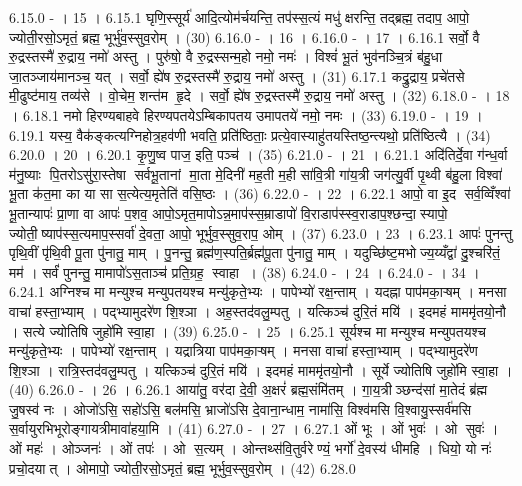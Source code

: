 6.15.0
- । 15 ।
6.15.1
घृणि॒स्सूर्य॑ आदि॒त्योम॑र्चयन्ति॒ तप॑स्स॒त्यं मधु॑ क्षरन्ति॒ तद्ब्रह्म॒ तदाप॒ आपो॒ ज्योती॒रसो॒ऽमृतं॒ ब्रह्म॒ भूर्भु॑व॒स्सुव॒रोम् । (30)
6.16.0
- । 16 ।
6.16.0
- । 17 ।
6.16.1
सर्वो॒ वै रु॒द्रस्तस्मै॑ रु॒द्राय॒ नमो॑ अस्तु । पुरु॑षो॒ वै रु॒द्रस्सन्म॒हो नमो॒ नमः॑ । विश्वं॑ भू॒तं भुव॑नञ्चि॒त्रं ब॑हु॒धा जा॒तञ्जाय॑मानञ्च॒ यत् । सर्वो॒ ह्ये॑ष रु॒द्रस्तस्मै॑ रु॒द्राय॒ नमो॑ अस्तु । (31)
6.17.1
कद्रु॒द्राय॒ प्रचे॑तसे मी॒ढुष्ट॑माय॒ तव्य॑से । वो॒चेम॒ शन्त॑म हृ॒दे । सर्वो॒ ह्ये॑ष रु॒द्रस्तस्मै॑ रु॒द्राय॒ नमो॑ अस्तु । (32)
6.18.0
- । 18 ।
6.18.1
नमो हिरण्यबाहवे हिरण्यपतयेऽम्बिकापतय उमापतये॑ नमो॒ नमः । (33)
6.19.0
- । 19 ।
6.19.1
यस्य॒ वैक॑ङ्कत्यग्निहोत्र॒हव॑णी भवति॒ प्रति॑ष्ठिताः॒ प्रत्ये॒वास्याहु॑तयस्तिष्ठ॒न्त्यथो॒ प्रति॑ष्ठित्यै । (34)
6.20.0
। 20 ।
6.20.1
कृ॒णु॒ष्व पाज॒ इति॒ पञ्च॑ । (35)
6.21.0
- । 21 ।
6.21.1
अदि॑तिर्दे॒वा ग॑न्ध॒र्वा म॑नु॒ष्याः पि॒तरोऽसु॑रा॒स्तेषा॑ सर्वभू॒तानां मा॒ता मे॒दिनी॑ मह॒ती म॒ही सा॑वि॒त्री गा॑य॒त्री जग॑त्यु॒र्वी पृ॒थ्वी ब॑हु॒ला विश्वा॑ भू॒ता क॑त॒मा का या सा स॒त्येत्य॒मृतेति॑ वसि॒ष्ठः । (36)
6.22.0
- । 22 ।
6.22.1
आपो॒ वा इ॒द सर्व॒व्विँश्वा॑ भू॒तान्यापः॑ प्रा॒णा वा आपः॑ प॒शव॒ आपो॒ऽमृत॒मापोऽन्न॒माप॑स्स॒म्राडापो॑ वि॒राडाप॑स्स्व॒राडाप॒श्छन्दा॒॒स्यापो॒ ज्योती॒॒ष्याप॑स्स॒त्यमाप॒स्सर्वा॑ दे॒वता॒ आपो॒ भूर्भुव॒स्सुव॒राप॒ ओम् । (37)
6.23.0
। 23 ।
6.23.1
आपः॑ पुनन्तु पृथि॒वीं पृ॑थि॒वी पू॒ता पु॑नातु॒ माम् । पु॒नन्तु॒ ब्रह्म॑ण॒स्पति॒र्ब्रह्म॑पू॒ता पु॑नातु॒ माम् । यदुच्छि॑ष्ट॒मभोज्य॒य्यँद्वा॑ दु॒श्चरि॑तं॒ मम॑ । सर्वं॑ पुनन्तु॒ मामापो॑ऽस॒ताञ्च॑ प्रति॒ग्रह॒॒ स्वाहा । (38)
6.24.0
- । 24 ।
6.24.0
- । 34 ।
6.24.1
अग्निश्च मा मन्युश्च मन्युपतयश्च मन्यु॑कृते॒भ्यः । पापेभ्यो॑ रक्ष॒न्ताम् । यदह्ना पाप॑मका॒ऱ्षम् । मनसा वाचा॑ हस्ता॒भ्याम् । पद्भ्यामुदरे॑ण शि॒श्ञा । अह॒स्तद॑वलु॒म्पतु । यत्किञ्च॑ दुरि॒तं मयि॑ । इदमहं माममृ॑तयो॒नौ । सत्ये ज्योतिषि जुहो॑मि स्वा॒हा । (39)
6.25.0
- । 25 ।
6.25.1
सूर्यश्च मा मन्युश्च मन्युपतयश्च मन्यु॑कृते॒भ्यः । पापेभ्यो॑ रक्ष॒न्ताम् । यद्रात्रिया पाप॑मका॒ऱ्षम् । मनसा वाचा॑ हस्ता॒भ्याम् । पद्भ्यामुदरे॑ण शि॒श्ञा । रात्रि॒स्तद॑वलु॒म्पतु । यत्किञ्च॑ दुरि॒तं मयि॑ । इदमहं माममृ॑तयो॒नौ । सूर्ये ज्योतिषि जुहो॑मि स्वा॒हा । (40)
6.26.0
- । 26 ।
6.26.1
आया॑तु॒ वर॑दा दे॒वी॒ अ॒क्षरं॑ ब्रह्म॒संमि॑तम् । गा॒य॒त्रीञ्छन्द॑सां मा॒तेदं ब्र॑ह्म जु॒षस्व॑ नः । ओजो॑ऽसि॒ सहो॑ऽसि॒ बल॑मसि॒ भ्राजो॑ऽसि दे॒वाना॒न्धाम॒ नामा॑सि॒ विश्व॑मसि वि॒श्वायु॒स्सर्व॑मसि स॒र्वायुरभिभूरोङ्गायत्रीमावा॑हया॒मि । (41)
6.27.0
- । 27 ।
6.27.1
ओं भूः । ओं भुवः॑ । ओ सुवः॑ । ओं महः॑ । ओञ्जनः॑ । ओं तपः॑ । ओ स॒त्यम् । ओन्तथ्स॑वि॒तुर्वरेण्यं॒ भर्गो॑ दे॒वस्य॑ धीमहि । धियो॒ यो नः॑ प्रचो॒दयात् । ओमापो॒ ज्योती॒रसो॒ऽमृतं॒ ब्रह्म॒ भूर्भुव॒स्सुव॒रोम् । (42)
6.28.0
